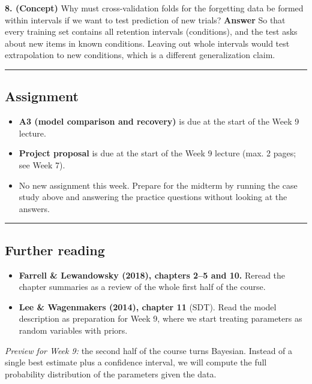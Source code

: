\textbf{8. (Concept)} Why must cross-validation folds for the forgetting
data be formed within intervals if we want to test prediction of new
trials? \textbf{Answer} So that every training set contains all
retention intervals (conditions), and the test asks about new items in
known conditions. Leaving out whole intervals would test extrapolation
to new conditions, which is a different generalization claim.

\begin{center}\rule{0.5\linewidth}{0.5pt}\end{center}

\subsection{Assignment}

\begin{itemize}
\tightlist
\item
  \textbf{A3 (model comparison and recovery)} is due at the start of the
  Week 9 lecture.
\item
  \textbf{Project proposal} is due at the start of the Week 9 lecture
  (max. 2 pages; see Week 7).
\item
  No new assignment this week. Prepare for the midterm by running the
  case study above and answering the practice questions without looking
  at the answers.
\end{itemize}

\begin{center}\rule{0.5\linewidth}{0.5pt}\end{center}

\subsection{Further reading}

\begin{itemize}
\tightlist
\item
  \textbf{Farrell \& Lewandowsky (2018), chapters 2--5 and 10.} Reread
  the chapter summaries as a review of the whole first half of the
  course.
\item
  \textbf{Lee \& Wagenmakers (2014), chapter 11} (SDT). Read the model
  description as preparation for Week 9, where we start treating
  parameters as random variables with priors.
\end{itemize}

\emph{Preview for Week 9:} the second half of the course turns Bayesian.
Instead of a single best estimate plus a confidence interval, we will
compute the full probability distribution of the parameters given the
data.
